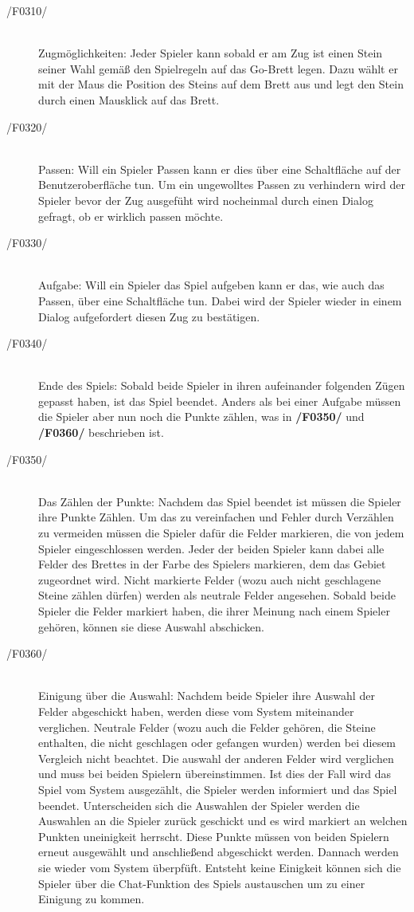 \begin{description}
	\item[/F0310/]~\\
		Zugmöglichkeiten: Jeder Spieler kann sobald er am Zug ist einen Stein seiner Wahl gemäß den Spielregeln auf das Go-Brett legen. Dazu wählt er mit der Maus die Position des Steins auf dem Brett aus und legt den Stein durch einen Mausklick auf das Brett.
	\item[/F0320/]~\\
		Passen: Will ein Spieler Passen kann er dies über eine Schaltfläche auf der Benutzeroberfläche tun. Um ein ungewolltes Passen zu verhindern wird der Spieler bevor der Zug ausgefüht wird nocheinmal durch einen Dialog gefragt, ob er wirklich passen möchte.
	\item[/F0330/]~\\
		Aufgabe: Will ein Spieler das Spiel aufgeben kann er das, wie auch das Passen, über eine Schaltfläche tun. Dabei wird der Spieler wieder in einem Dialog aufgefordert diesen Zug zu bestätigen.
	\item[/F0340/]~\\
		Ende des Spiels: Sobald beide Spieler in ihren aufeinander folgenden Zügen gepasst haben, ist das Spiel beendet. Anders als bei einer Aufgabe müssen die Spieler aber nun noch die Punkte zählen, was in \textbf{/F0350/} und \textbf{/F0360/} beschrieben ist.
	\item[/F0350/]~\\
		Das Zählen der Punkte: Nachdem das Spiel beendet ist müssen die Spieler ihre Punkte Zählen. Um das zu vereinfachen und Fehler durch Verzählen zu vermeiden müssen die Spieler dafür die Felder markieren, die von jedem Spieler eingeschlossen werden. Jeder der beiden Spieler kann dabei alle Felder des Brettes in der Farbe des Spielers markieren, dem das Gebiet zugeordnet wird. Nicht markierte Felder (wozu auch nicht geschlagene Steine zählen dürfen) werden als neutrale Felder angesehen. Sobald beide Spieler die Felder markiert haben, die ihrer Meinung nach einem Spieler gehören, können sie diese Auswahl abschicken.
	\item[/F0360/]~\\
		Einigung über die Auswahl: Nachdem beide Spieler ihre Auswahl der Felder abgeschickt haben, werden diese vom System miteinander verglichen. Neutrale Felder (wozu auch die Felder gehören, die Steine enthalten, die nicht geschlagen oder gefangen wurden) werden bei diesem Vergleich nicht beachtet. Die auswahl der anderen Felder wird verglichen und muss bei beiden Spielern übereinstimmen. Ist dies der Fall wird das Spiel vom System ausgezählt, die Spieler werden informiert und das Spiel beendet. Unterscheiden sich die Auswahlen der Spieler werden die Auswahlen an die Spieler zurück geschickt und es wird markiert an welchen Punkten uneinigkeit herrscht. Diese Punkte müssen von beiden Spielern erneut ausgewählt und anschließend abgeschickt werden. Dannach werden sie wieder vom System überpfüft. Entsteht keine Einigkeit können sich die Spieler über die Chat-Funktion des Spiels austauschen um zu einer Einigung zu kommen.
\end{description}

